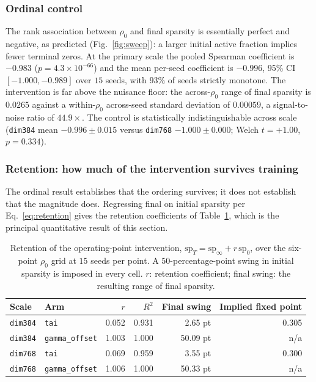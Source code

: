 \documentclass[final,5p,times,twocolumn]{elsarticle}
\theoremstyle{remark}
\newcommand{\rhoz}{\rho_{0}}
\begin{document}
\subsubsection{Ordinal control}

The rank association between $\rhoz$ and final sparsity is essentially perfect
and negative, as predicted (Fig.~\ref{fig:sweep}): a larger initial active
fraction implies fewer terminal zeros. At the primary scale the pooled Spearman coefficient is
$-0.983$ ($p = 4.3\times 10^{-66}$) and the mean per-seed coefficient is
$-0.996$, 95\% CI $[-1.000, -0.989]$ over $15$ seeds, with $93\%$ of seeds
strictly monotone. The intervention is far above the nuisance floor: the
across-$\rhoz$ range of final sparsity is $0.0265$ against a within-$\rhoz$
across-seed standard deviation of $0.00059$, a signal-to-noise ratio of
$44.9\times$. The control is statistically indistinguishable across scale
(\texttt{dim384} mean $-0.996 \pm 0.015$ versus \texttt{dim768}
$-1.000 \pm 0.000$; Welch $t = +1.00$, $p = 0.334$).

\subsubsection{Retention: how much of the intervention survives training}

The ordinal result establishes that the ordering survives; it does not
establish that the magnitude does. Regressing final on initial sparsity
per Eq.~\eqref{eq:retention} gives the retention coefficients of
Table~\ref{tab:retention}, which is the principal quantitative result of this
section.

\begin{table}[t]
\centering
\small
\caption{Retention of the operating-point intervention,
$\mathrm{sp}_T = \mathrm{sp}_\infty + r\,\mathrm{sp}_0$, over the six-point
$\rhoz$ grid at $15$ seeds per point. A $50$-percentage-point swing in initial
sparsity is imposed in every cell. $r$: retention coefficient; final swing: the
resulting range of final sparsity.}
\label{tab:retention}
\begin{tabular}{@{}llrrrr@{}}
\toprule
Scale & Arm & $r$ & $R^{2}$ & Final swing & Implied fixed point \\
\midrule
\texttt{dim384} & \texttt{tai} & 0.052 & 0.931 & \phantom{0}2.65 pt & 0.305 \\
\texttt{dim384} & \texttt{gamma\_offset} & 1.003 & 1.000 & 50.09 pt & n/a \\
\texttt{dim768} & \texttt{tai} & 0.069 & 0.959 & \phantom{0}3.55 pt & 0.300 \\
\texttt{dim768} & \texttt{gamma\_offset} & 1.006 & 1.000 & 50.33 pt & n/a \\
\bottomrule
\end{tabular}
\end{table}
\end{document}
